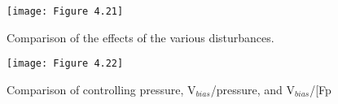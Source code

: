 \begin{figure}[H]
	\centering
	\texttt{[image: Figure 4.21]}
	\bf\caption{  Comparison of the effects of the various disturbances.}
	\label{fig:4.21}
\end{figure}

\begin{figure}[H]
	\centering
	\texttt{[image: Figure 4.22]}
	\bf\caption{  Comparison of controlling pressure, $\text{V}_{bias}$/pressure, and $\text{V}_{bias}$/[Fp}
	\label{fig:4.22}
\end{figure}
